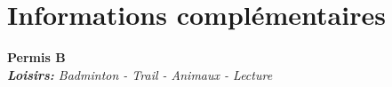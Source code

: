 \documentclass[letterpaper,11pt]{article}
\makeatletter
\newcommand{\resumeItem}[1]{
  \item\small{
    {#1 \vspace{-2pt}}
  }
}
\newcommand{\resumeProjectHeading}[2]{
    \item
    \begin{tabular*}{0.97\textwidth}{l@{\extracolsep{\fill}}r}
      \small#1 & #2 \\
    \end{tabular*}\vspace{-7pt}
}
\newcommand{\resumeSubHeadingListStart}{\begin{itemize}[leftmargin=0.15in, label={}]}
\newcommand{\resumeSubHeadingListEnd}{\end{itemize}}
\newcommand{\resumeItemListStart}{\begin{itemize}}
\newcommand{\resumeItemListEnd}{\end{itemize}\vspace{-5pt}}
\makeatother
\begin{document}


\section{Informations complémentaires}
\begin{itemize}[leftmargin=0.15in, label={}]
  \small{\item{
        \textbf{Permis B} \\
        \textit{\textbf{Loisirs:} Badminton - Trail - Animaux - Lecture} \\
        }}
\end{itemize}


\end{document}
